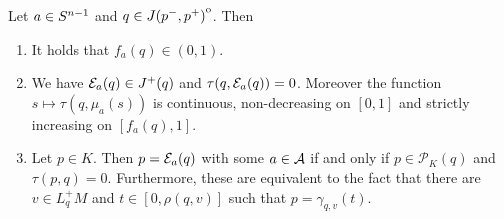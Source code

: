 \begin{lemma}\label{lem:observationtime}
Let $a\in S^{n-1}$ and $q \in {\kern0ptJ(p^-,p^+)}^{\mathrm{o}}$. Then
\begin{enumerate}[label={\textnormal{(\arabic*)}}]
    \item It holds that $f_a(q)\in (0,1)$.
    \item We have $\mathcal{E}_a(q)\in J^+(q)$ and $\tau(q,\mathcal{E}_a(q))=0$. Moreover the function $s\mapsto\tau(q,\mu_a(s))$ is continuous, non-decreasing on $[0,1]$ and strictly increasing on $[f_a(q),1]$.
    \item Let $p\in K$. Then $p=\mathcal{E}_a(q)$ with some $a\in \mathcal{A}$ if and only if $p\in \mathcal{P}_K(q)$ and $\tau(p,q)=0$. Furthermore, these are equivalent to the fact that there are $v\in L^+_qM$ and $t\in[0,\rho(q,v)]$ such that $p=\gamma_{q,v}(t)$.
\end{enumerate}
\end{lemma}
